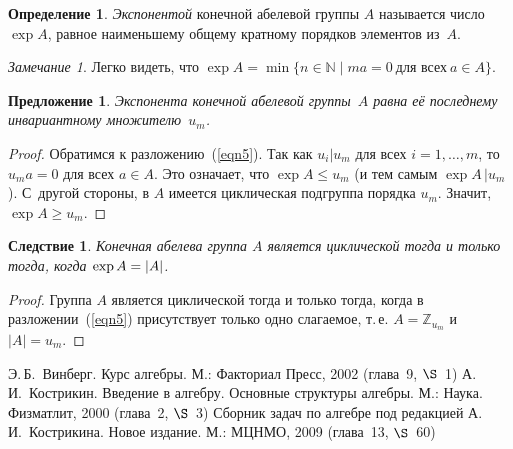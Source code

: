 \documentclass[a4paper,10pt]{amsart}
\def\ZZ{{\mathbb Z}}%
\def\NN{{\mathbb N}}%
\newtheorem{proposition}{Предложение}
\newtheorem{corollary}{Следствие}
\theoremstyle{definition}
\newtheorem{definition}{Определение}
\theoremstyle{remark}
\newtheorem{remark}{Замечание}
\begin{document}
\begin{definition}
{\it Экспонентой} конечной абелевой группы $A$ называется число
$\exp A$, равное наименьшему общему кратному порядков элементов
из~$A$.
\end{definition}

\begin{remark}
Легко видеть, что $\exp A = \min \lbrace n \in \NN \mid ma = 0 \
\text{для всех} \ a \in A \rbrace$.
\end{remark}

\begin{proposition}
Экспонента конечной абелевой группы~$A$ равна её последнему
инвариантному множителю~$u_m$.
\end{proposition}

\begin{proof}
Обратимся к разложению~(\ref{eqn5}). Так как $u_i | u_m$ для всех $i
= 1, \ldots, m$, то $u_ma=0$ для всех $a \in A$. Это означает, что
$\exp A \leqslant u_m$ (и тем самым $\exp A \, | u_m$). С~другой
стороны, в $A$ имеется циклическая подгруппа порядка $u_m$. Значит,
$\exp A \geqslant u_m$.
\end{proof}

\begin{corollary}
Конечная абелева группа $A$ является циклической тогда и только
тогда, когда $\exp A =\nobreak |A|$.
\end{corollary}

\begin{proof}
Группа $A$ является циклической тогда и только тогда, когда в
разложении~(\ref{eqn5}) присутствует только одно слагаемое, т.\,е.
$A = \ZZ_{u_m}$ и $|A| = u_m$.
\end{proof}

\bigskip

\begin{thebibliography}{99}
Э.\,Б.~Винберг. Курс алгебры. М.: Факториал Пресс, 2002 (глава~9,
$\S$~1)
А.\,И.~Кострикин. Введение в алгебру. Основные структуры алгебры.
М.: Наука. Физматлит, 2000 (глава~2, $\S$~3)
Сборник задач по алгебре под редакцией А.\,И.~Кострикина. Новое
издание. М.: МЦНМО, 2009 (глава~13, $\S$~60)
\end{thebibliography}
\end{document}
